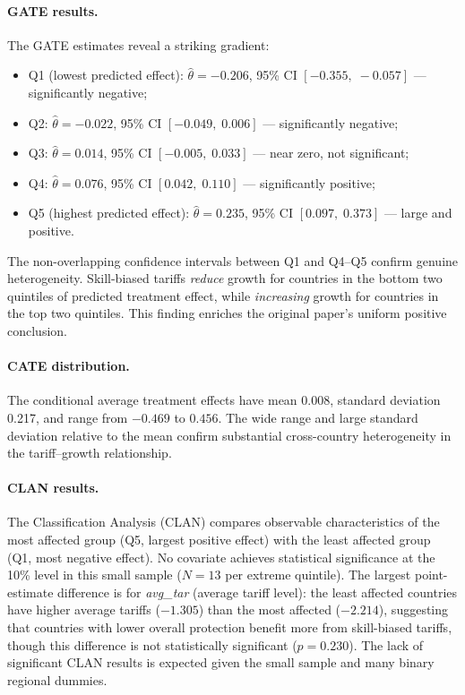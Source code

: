 \documentclass[12pt]{article}
\begin{document}
\paragraph{GATE results.}
The GATE estimates reveal a striking gradient:
\begin{itemize}
  \item Q1 (lowest predicted effect): $\hat\theta = -0.206$,
        95\% CI $[-0.355,\; -0.057]$
        --- significantly negative;
  \item Q2: $\hat\theta = -0.022$,
        95\% CI $[-0.049,\; 0.006]$
        --- significantly negative;
  \item Q3: $\hat\theta = 0.014$,
        95\% CI $[-0.005,\; 0.033]$
        --- near zero, not significant;
  \item Q4: $\hat\theta = 0.076$,
        95\% CI $[0.042,\; 0.110]$
        --- significantly positive;
  \item Q5 (highest predicted effect): $\hat\theta = 0.235$,
        95\% CI $[0.097,\; 0.373]$
        --- large and positive.
\end{itemize}
The non-overlapping confidence intervals between Q1 and Q4--Q5 confirm
genuine heterogeneity. Skill-biased tariffs \textit{reduce} growth for
countries in the bottom two quintiles of predicted treatment effect, while
\textit{increasing} growth for countries in the top two quintiles. This
finding enriches the original paper's uniform positive conclusion.

\paragraph{CATE distribution.}
The conditional average treatment effects have mean 0.008,
standard deviation 0.217, and range from
$-0.469$ to $0.456$.
The wide range and large standard deviation relative to the mean confirm
substantial cross-country heterogeneity in the tariff--growth
relationship.



\paragraph{CLAN results.}
The Classification Analysis (CLAN) compares observable characteristics
of the most affected group (Q5, largest positive effect) with the least
affected group (Q1, most negative effect). No covariate achieves
statistical significance at the 10\% level in this small sample
($N = 13$ per extreme quintile). The largest point-estimate difference
is for \textit{avg\_tar} (average tariff level): the least affected
countries have higher average tariffs ($-1.305$) than the most affected
($-2.214$), suggesting that countries with lower overall protection
benefit more from skill-biased tariffs, though this difference is
not statistically significant ($p = 0.230$). The lack of significant
CLAN results is expected given the small sample and many binary regional
dummies.
\end{document}
